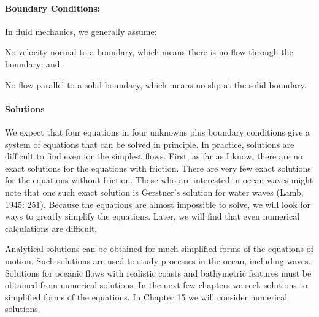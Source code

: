 \paragraph{Boundary Conditions:}
In fluid mechanics, we generally assume:
\begin{enumerate}
\vitem No velocity normal to a boundary, which means there is no flow
through the boundary; and

\vitem No flow parallel to a solid boundary, which means no slip at
the solid boundary.
\end{enumerate}

\paragraph{Solutions}
We expect that four equations in four unknowns plus boundary
conditions give a system of equations that can be solved in
principle. In practice, solutions are difficult to find even for the
simplest flows. First, as far as I know, there are no exact solutions
for the equations with friction. There are very few exact solutions
for the equations without friction. Those who are interested in ocean
waves might note that one such exact solution is Gerstner's solution
for water waves (Lamb, 1945: 251). Because the equations are almost
impossible to solve, we will look for ways to greatly simplify the
equations. Later, we will find that even numerical calculations are
difficult.

Analytical solutions can be obtained for much simplified forms of the
equations of motion. Such solutions are used to study processes in the
ocean, including waves. Solutions for oceanic flows with realistic
coasts and bathymetric features must be obtained from numerical
solutions. In the next few chapters we seek solutions to simplified
forms of the equations. In Chapter 15 we will consider numerical
solutions.

